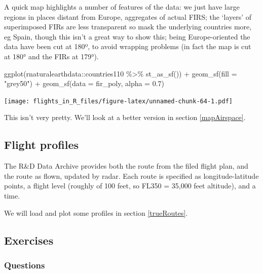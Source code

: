 \documentclass[
]{book}
\newenvironment{Shaded}{\begin{snugshade}}{\end{snugshade}}
\newcommand{\AttributeTok}[1]{\textcolor[rgb]{0.77,0.63,0.00}{#1}}
\newcommand{\FloatTok}[1]{\textcolor[rgb]{0.00,0.00,0.81}{#1}}
\newcommand{\FunctionTok}[1]{\textcolor[rgb]{0.00,0.00,0.00}{#1}}
\newcommand{\NormalTok}[1]{#1}
\newcommand{\SpecialCharTok}[1]{\textcolor[rgb]{0.00,0.00,0.00}{#1}}
\newcommand{\StringTok}[1]{\textcolor[rgb]{0.31,0.60,0.02}{#1}}
\begin{document}
A quick map highlights a number of features of the data: we just have large regions in places distant from Europe, aggregates of actual FIRS; the `layers' of superimposed FIRs are less transparent so mask the underlying countries more, eg Spain, though this isn't a great way to show this; being Europe-oriented the data have been cut at 180º, to avoid wrapping problems (in fact the map is cut at 180° and the FIRs at 179°).

\begin{Shaded}
\begin{Highlighting}[]
\FunctionTok{ggplot}\NormalTok{(rnaturalearthdata}\SpecialCharTok{::}\NormalTok{countries110 }\SpecialCharTok{\%\textgreater{}\%} \FunctionTok{st\_as\_sf}\NormalTok{()) }\SpecialCharTok{+}
  \FunctionTok{geom\_sf}\NormalTok{(}\AttributeTok{fill =} \StringTok{"grey50"}\NormalTok{) }\SpecialCharTok{+} 
  \FunctionTok{geom\_sf}\NormalTok{(}\AttributeTok{data =}\NormalTok{ fir\_poly, }\AttributeTok{alpha =} \FloatTok{0.7}\NormalTok{) }
\end{Highlighting}
\end{Shaded}

\texttt{[image: flights\_in\_R\_files/figure-latex/unnamed-chunk-64-1.pdf]}

This isn't very pretty. We'll look at a better version in section \ref{mapAirspace}.

\hypertarget{flight-profiles}{%
\subsection{Flight profiles}\label{flight-profiles}}

The R\&D Data Archive provides both the route from the filed flight plan, and the route as flown, updated by radar. Each route is specified as longitude-latitude points, a flight level (roughly of 100 feet, so FL350 = 35,000 feet altitude), and a time.

We will load and plot some profiles in section \ref{trueRoutes}.

\hypertarget{exercises-5}{%
\subsection{Exercises}\label{exercises-5}}

\hypertarget{questions-9}{%
\subsubsection{Questions}\label{questions-9}}
\end{document}
